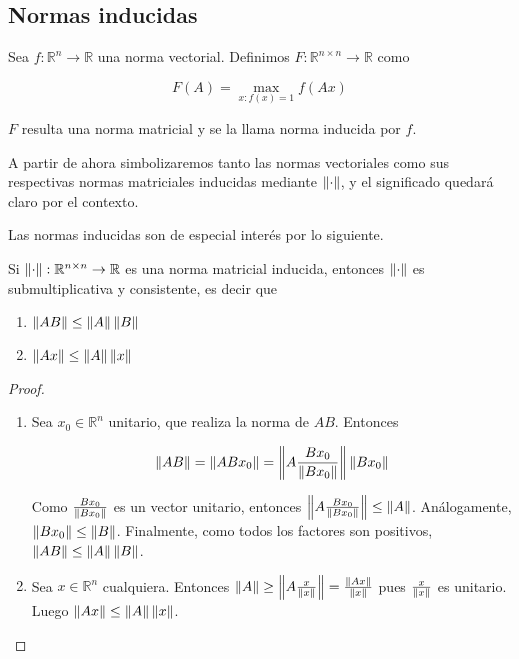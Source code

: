 \subsection{Normas inducidas}

\begin{defi}
Sea $f : \mathbb{R}^n \to \mathbb{R}$ una norma vectorial. Definimos $F : \mathbb{R}^{n \times n} \to \mathbb{R}$ como

\[
F(A) = \max\limits_{x : f(x) = 1} f(Ax)
\]

$F$ resulta una norma matricial y se la llama norma inducida por $f$.
\end{defi}

A partir de ahora simbolizaremos tanto las normas vectoriales como sus respectivas normas matriciales inducidas mediante $\left\lVert\cdot\right\rVert$, y el significado quedará claro por el contexto.

Las normas inducidas son de especial interés por lo siguiente.

\begin{propo}
Si $\left\lVert\cdot\right\rVert : \mathbb{R}^{n \times n} \to \mathbb{R}$ es una norma matricial inducida, entonces $\left\lVert\cdot\right\rVert$ es submultiplicativa y consistente, es decir que
\begin{enumerate}
\item $\left\lVert AB\right\rVert \leq \left\lVert A\right\rVert\left\lVert B\right\rVert$
\item $\left\lVert Ax\right\rVert \leq \left\lVert A\right\rVert\left\lVert x\right\rVert$
\end{enumerate}

\begin{proof}
\begin{enumerate}
\item Sea $x_0 \in \mathbb{R}^n$ unitario, que realiza la norma de $AB$. Entonces

\[\left\lVert AB\right\rVert = \left\lVert ABx_0\right\rVert = \left\lVert A\frac{Bx_0}{\left\lVert Bx_0\right\rVert}\right\rVert\left\lVert Bx_0\right\rVert\]

Como $\frac{Bx_0}{\left\lVert Bx_0\right\rVert}$ es un vector unitario, entonces $\left\lVert A\frac{Bx_0}{\left\lVert Bx_0\right\rVert}\right\rVert \leq \left\lVert A\right\rVert$. Análogamente, $\left\lVert Bx_0\right\rVert \leq \left\lVert B\right\rVert$. Finalmente, como todos los factores son positivos, $\left\lVert AB\right\rVert \leq \left\lVert A\right\rVert \left\lVert B\right\rVert$.

\item Sea $x \in \mathbb{R}^n$ cualquiera. Entonces $\left\lVert A\right\rVert \geq \left\lVert A \frac{x}{\left\lVert x\right\rVert}\right\rVert = \frac{\left\lVert Ax\right\rVert}{\left\lVert x\right\rVert}$ pues $\frac{x}{\left\lVert x\right\rVert}$ es unitario. Luego $\left\lVert Ax\right\rVert \leq \left\lVert A\right\rVert\left\lVert x\right\rVert$.
\end{enumerate}
\end{proof}
\end{propo}

